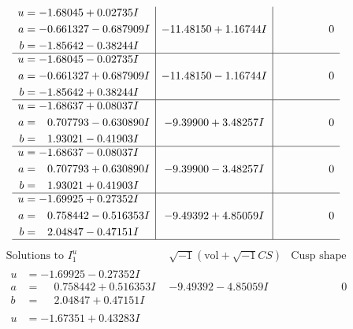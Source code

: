 \documentclass[1p]{elsarticle_modified}
\theoremstyle{definition}
\newcommand{\I}{\sqrt{-1}}
\begin{document}
$$\begin{array}{c|c|c}
\begin{aligned}
u &= -1.68045 + 0.02735 I \\
a &= -0.661327 - 0.687909 I \\
b &= -1.85642 - 0.38244 I\end{aligned}
 & -11.48150 + 1.16744 I & \phantom{-0.000000 } 0 \\ \hline\begin{aligned}
u &= -1.68045 - 0.02735 I \\
a &= -0.661327 + 0.687909 I \\
b &= -1.85642 + 0.38244 I\end{aligned}
 & -11.48150 - 1.16744 I & \phantom{-0.000000 } 0 \\ \hline\begin{aligned}
u &= -1.68637 + 0.08037 I \\
a &= \phantom{-}0.707793 - 0.630890 I \\
b &= \phantom{-}1.93021 - 0.41903 I\end{aligned}
 & -9.39900 + 3.48257 I & \phantom{-0.000000 } 0 \\ \hline\begin{aligned}
u &= -1.68637 - 0.08037 I \\
a &= \phantom{-}0.707793 + 0.630890 I \\
b &= \phantom{-}1.93021 + 0.41903 I\end{aligned}
 & -9.39900 - 3.48257 I & \phantom{-0.000000 } 0 \\ \hline\begin{aligned}
u &= -1.69925 + 0.27352 I \\
a &= \phantom{-}0.758442 - 0.516353 I \\
b &= \phantom{-}2.04847 - 0.47151 I\end{aligned}
 & -9.49392 + 4.85059 I & \phantom{-0.000000 } 0\\
 \hline 
 \end{array}$$\newpage$$\begin{array}{c|c|c}  
\text{Solutions to }I^u_{1}& \I (\text{vol} + \sqrt{-1}CS) & \text{Cusp shape}\\
 \hline 
\begin{aligned}
u &= -1.69925 - 0.27352 I \\
a &= \phantom{-}0.758442 + 0.516353 I \\
b &= \phantom{-}2.04847 + 0.47151 I\end{aligned}
 & -9.49392 - 4.85059 I & \phantom{-0.000000 } 0 \\ \hline\begin{aligned}
u &= -1.67351 + 0.43283 I \\

\end{aligned}
\end{array}$$
\end{document}

